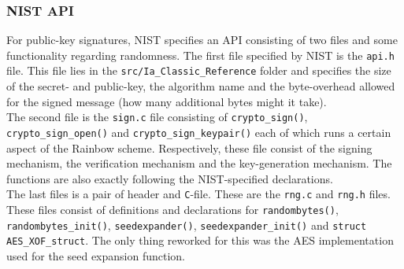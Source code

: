 \subsubsection{NIST API}
For public-key signatures, NIST specifies an API consisting of two files and some functionality regarding randomness. The first file specified by NIST is the \texttt{api.h} file. This file lies in the \texttt{src/Ia\_Classic\_Reference} folder and specifies the size of the secret- and public-key, the algorithm name and the byte-overhead allowed for the signed message (how many additional bytes might it take).
\medskip\\
The second file is the \texttt{sign.c} file consisting of \texttt{crypto\_sign()}, \texttt{crypto\_sign\_open()} and \texttt{crypto\_sign\_keypair()} each of which runs a certain aspect of the Rainbow scheme. Respectively, these file consist of the signing mechanism, the verification mechanism and the key-generation mechanism. The functions are also exactly following the NIST-specified declarations.
\medskip\\
The last files is a pair of header and \texttt{C}-file. These are the \texttt{rng.c} and \texttt{rng.h} files. These files consist of definitions and declarations for \texttt{randombytes()}, \texttt{randombytes\_init()}, \texttt{seedexpander()}, \texttt{seedexpander\_init()} and \texttt{struct AES\_XOF\_struct}. The only thing reworked for this was the AES implementation used for the seed expansion function.
